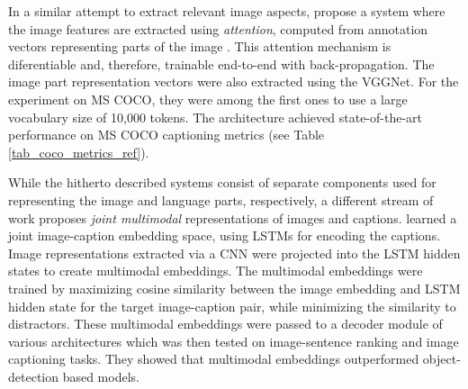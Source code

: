 In a similar attempt to extract relevant image aspects, \cite{xu2015show} propose a system where the image features are extracted using \textit{attention}, computed from annotation vectors representing parts of the image \parencite{bahdanau2014neural}. %
This attention mechanism is diferentiable and, therefore, trainable end-to-end with back-propagation. The image part representation vectors were also extracted using the VGGNet.
For the experiment on MS COCO, they were among the first ones to use a large vocabulary size of 10,000 tokens. The architecture achieved state-of-the-art performance on MS COCO captioning metrics (see Table \ref{tab_coco_metrics_ref}).%

While the hitherto described systems consist of separate components used for representing the image and language parts, respectively, a different stream of work proposes \textit{joint multimodal} representations of images and captions. \cite{kiros2014unifying} learned a joint image-caption embedding space, using LSTMs for encoding the captions. Image representations extracted via a CNN were projected into the LSTM hidden states to create multimodal embeddings. The multimodal embeddings were trained by maximizing cosine similarity between the image embedding and LSTM hidden state for the target image-caption pair, while minimizing the similarity to distractors. These multimodal embeddings were passed to a decoder module of various architectures which was then tested on image-sentence ranking and image captioning tasks. They showed that multimodal embeddings outperformed object-detection based models.

